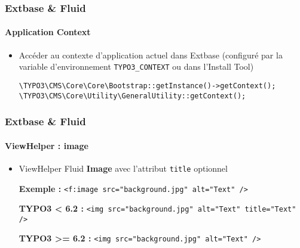 
\begin{frame}[fragile]
	\frametitle{Extbase \& Fluid}
	\framesubtitle{Application Context}

	\begin{itemize}
		\item Accéder au contexte d'application actuel dans Extbase\newline
			(configuré par la variable d'environnement \texttt{TYPO3\_CONTEXT} ou dans l'Install Tool)\newline

			\lstinline!\TYPO3\CMS\Core\Core\Bootstrap::getInstance()->getContext();!
			\lstinline!\TYPO3\CMS\Core\Utility\GeneralUtility::getContext();!

	\end{itemize}

\end{frame}


\begin{frame}[fragile]
	\frametitle{Extbase \& Fluid}
	\framesubtitle{ViewHelper : image}

	\begin{itemize}
		\item ViewHelper Fluid \textbf{Image} avec l'attribut \texttt{title} optionnel\newline

			\smaller\textbf{Exemple :}\normalsize\newline
			\lstinline!<f:image src="background.jpg" alt="Text" />!
			\newline

			\smaller\textbf{TYPO3 < 6.2 :}\normalsize\newline
			\lstinline!<img src="background.jpg" alt="Text" title="Text" />!
			\newline

			\smaller\textbf{TYPO3 >= 6.2 :}\normalsize\newline
			\lstinline!<img src="background.jpg" alt="Text" />!

	\end{itemize}

\end{frame}

